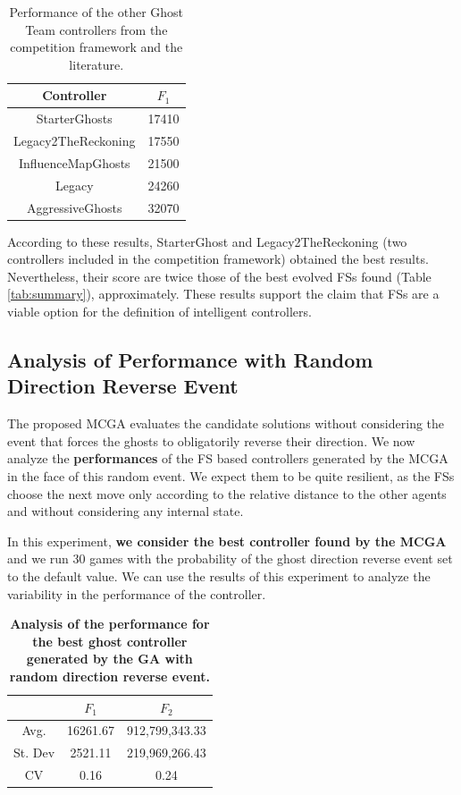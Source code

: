 \documentclass[journal]{IEEEtran}
\begin{document}
\begin{table} [!t]
\caption{Performance of the other Ghost Team controllers from the competition framework and the literature.}
\label{tab:summary_others}
\centering
\begin{tabular}{|c|c|}
\hline 
Controller & $F_1$ \\
\hline
StarterGhosts & 17410 \\
\hline
Legacy2TheReckoning & 17550 \\
\hline
InfluenceMapGhosts \cite{Svensson2012} & 21500 \\
\hline
Legacy & 24260 \\
\hline
AggressiveGhosts & 32070 \\
\hline
\end{tabular}
\end{table}

According to these results, StarterGhost and Legacy2TheReckoning (two controllers included in the competition framework) obtained the best results. Nevertheless, their score are twice those of the best evolved FSs found (Table \ref{tab:summary}), approximately. These results support the claim that FSs are a viable option for the definition of intelligent controllers.

\subsection{\textbf{Analysis of Performance with Random Direction Reverse Event}}

The proposed MCGA evaluates the candidate solutions without considering the event that forces the ghosts to obligatorily reverse their direction. We now analyze the \textbf{performances} of the FS based controllers generated by the MCGA in the face of this random event. We expect them to be quite resilient, as the FSs choose the next move only according to the relative distance to the other agents and without considering any internal state.

In this experiment, \textbf{we consider the best controller found by the MCGA} and we run 30 games with the probability of the ghost direction reverse event set to the default value. We can use the results of this experiment to analyze the variability in the performance of the controller.

\begin{table}[!t]
\caption{\textbf{Analysis of the performance for the best ghost controller generated by the GA with random direction reverse event.}}
\label{tab:summary_robust}
\centering
\begin{tabular}{|c|c|c|}
\hline
 & $F_1$ & $F_2$ \\
\hline
Avg.	&	16261.67	&	912,799,343.33	\\
\hline
St. Dev	&	2521.11	&	219,969,266.43	\\
\hline
CV	&	0.16	&	0.24	\\
\hline
\end{tabular}
\end{table}
\end{document}
